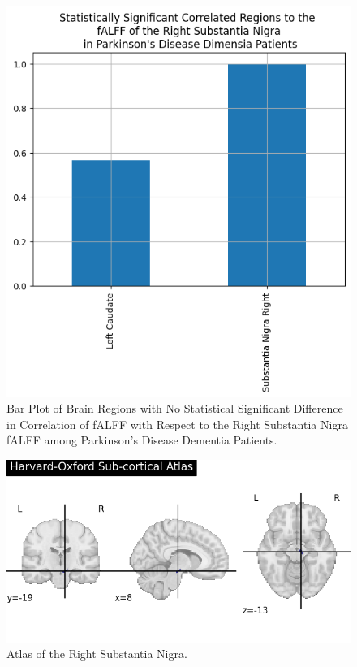 \documentclass[12pt]{article}
\begin{document}
\begin{figure}[h]  %
    \centering
    \includegraphics[width=\textwidth]{"../img/statistically_significant_correlated_regions_sn_pdd.png"}  %
    \caption{Bar Plot of Brain Regions with No Statistical Significant Difference in Correlation of fALFF with Respect to the Right Substantia Nigra fALFF among Parkinson's Disease Dementia Patients.}
    \label{fig:pdd}  %
\end{figure}


\begin{figure}[h]  %
    \centering
    \includegraphics[width=\textwidth]{"../img/brain_atlas.png"}  %
    \caption{Atlas of the Right Substantia Nigra.}
    \label{fig:SNR}  %
\end{figure}
\end{document}
